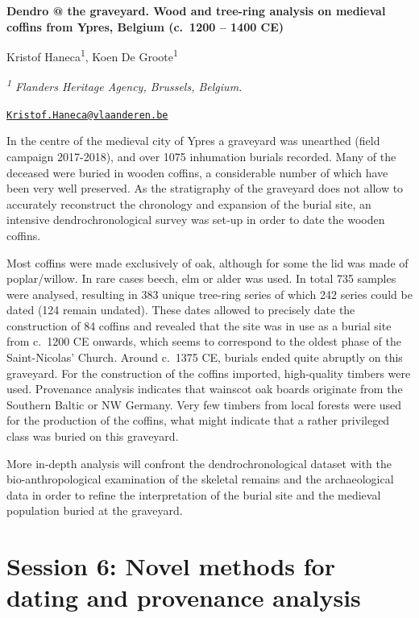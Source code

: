 \documentclass[
]{book}
\begin{document}
\textbf{Dendro @ the graveyard. Wood and tree-ring analysis on medieval coffins from Ypres, Belgium (c.~1200 -- 1400 CE)}

Kristof Haneca\textsuperscript{1}, Koen De Groote\textsuperscript{1}

\emph{\textsuperscript{1} Flanders Heritage Agency, Brussels, Belgium.}

\href{mailto:Kristof.Haneca@vlaanderen.be}{\nolinkurl{Kristof.Haneca@vlaanderen.be}}

In the centre of the medieval city of Ypres a graveyard was unearthed (field campaign 2017-2018), and over 1075 inhumation burials recorded. Many of the deceased were buried in wooden coffins, a considerable number of which have been very well preserved. As the stratigraphy of the graveyard does not allow to accurately reconstruct the chronology and expansion of the burial site, an intensive dendrochronological survey was set-up in order to date the wooden coffins.

Most coffins were made exclusively of oak, although for some the lid was made of poplar/willow. In rare cases beech, elm or alder was used. In total 735 samples were analysed, resulting in 383 unique tree-ring series of which 242 series could be dated (124 remain undated). These dates allowed to precisely date the construction of 84 coffins and revealed that the site was in use as a burial site from c.~1200 CE onwards, which seems to correspond to the oldest phase of the Saint-Nicolas' Church. Around c.~1375 CE, burials ended quite abruptly on this graveyard. For the construction of the coffins imported, high-quality timbers were used. Provenance analysis indicates that wainscot oak boards originate from the Southern Baltic or NW Germany. Very few timbers from local forests were used for the production of the coffins, what might indicate that a rather privileged class was buried on this graveyard.

More in-depth analysis will confront the dendrochronological dataset with the bio-anthropological examination of the skeletal remains and the archaeological data in order to refine the interpretation of the burial site and the medieval population buried at the graveyard.

\hypertarget{session-6-novel-methods-for-dating-and-provenance-analysis}{%
\chapter*{Session 6: Novel methods for dating and provenance analysis}\label{session-6-novel-methods-for-dating-and-provenance-analysis}}
\end{document}
